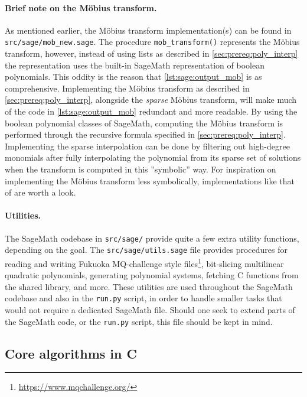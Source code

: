\paragraph{Brief note on the Möbius transform.} As mentioned earlier, the Möbius transform implementation(s) can be found in \texttt{src/sage/mob\_new.sage}. The procedure \texttt{mob\_transform()} represents the Möbius transform, however, instead of using lists as described in \cref{sec:prereq:poly_interp} the representation uses the built-in SageMath representation of boolean polynomials. This oddity is the reason that \cref{lst:sage:output_mob} is as comprehensive. Implementing the Möbius transform as described in \cref{sec:prereq:poly_interp}, alongside the \textit{sparse} Möbius transform, will make much of the code in \cref{lst:sage:output_mob} redundant and more readable. By using the boolean polynomial classes of SageMath, computing the Möbius transform is performed through the recursive formula specified in \cref{sec:prereq:poly_interp}. Implementing the sparse interpolation can be done by filtering out high-degree monomials after fully interpolating the polynomial from its sparse set of solutions when the transform is computed in this ''symbolic'' way. For inspiration on implementing the Möbius transform less symbolically, implementations like that of \cite{cryptoeprint:2022/1412} are worth a look.

\paragraph{Utilities.} The SageMath codebase in \texttt{src/sage/} provide quite a few extra utility functions, depending on the goal. The \texttt{src/sage/utils.sage} file provides procedures for reading and writing Fukuoka MQ-challenge style files\footnote{\url{https://www.mqchallenge.org/}}, bit-slicing multilinear quadratic polynomials, generating polynomial systems, fetching C functions from the shared library, and more. These utilities are used throughout the SageMath codebase and also in the \texttt{run.py} script, in order to handle smaller tasks that would not require a dedicated SageMath file. Should one seek to extend parts of the SageMath code, or the \texttt{run.py} script, this file should be kept in mind.

\subsection{Core algorithms in C} \label{sec:impl:c}

